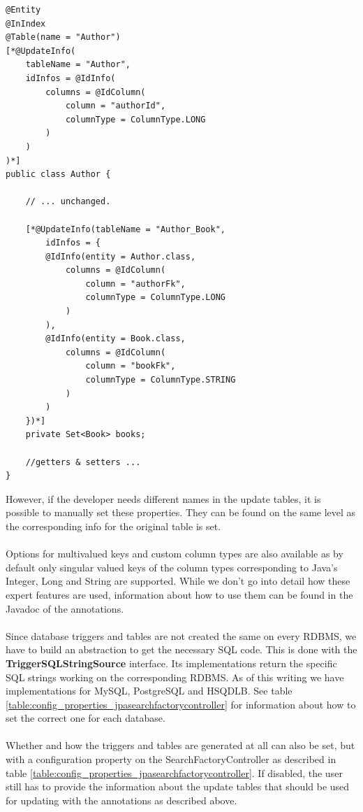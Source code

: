 \lstset{language=java}
\begin{lstlisting}[frame=htrbl, caption={Author.java with Hibernate Search annotations}, label={lst:author.java_3}]
@Entity
@InIndex
@Table(name = "Author")
[*@UpdateInfo(
	tableName = "Author", 
	idInfos = @IdInfo(
		columns = @IdColumn(
			column = "authorId", 
			columnType = ColumnType.LONG
		)
	)
)*]
public class Author {
	
	// ... unchanged.
	
	[*@UpdateInfo(tableName = "Author_Book", 
		idInfos = {
		@IdInfo(entity = Author.class, 
			columns = @IdColumn(
				column = "authorFk",
				columnType = ColumnType.LONG
			)
		),
		@IdInfo(entity = Book.class,
			columns = @IdColumn(
				column = "bookFk",
				columnType = ColumnType.STRING
			)
		)
	})*]
	private Set<Book> books;
	
	//getters & setters ...
}
\end{lstlisting}
\noindent
However, if the developer needs different names in the update tables, it is possible to manually set these properties. They can be found on the same level as the corresponding info for the original table is set.
\\\\
Options for multivalued keys and custom column types are also available as by default only singular valued keys of the column types corresponding to Java's Integer, Long and String are supported. While we don't go into detail how these expert features are used, information about how to use them can be found in the Javadoc of the annotations.
\\\\
Since database triggers and tables are not created the same on every RDBMS, we have to build an abstraction to get the necessary SQL code. This is done with the \textbf{TriggerSQLStringSource} interface. Its implementations return the specific SQL strings working on the corresponding RDBMS. As of this writing we have implementations for MySQL, PostgreSQL and HSQDLB. See table \ref{table:config_properties_jpasearchfactorycontroller} for information about how to set the correct one for each database.
\\\\
Whether and how the triggers and tables are generated at all can also be set, but with a configuration property on the SearchFactoryController as described in table  \ref{table:config_properties_jpasearchfactorycontroller}. If disabled, the user still has to provide the information about the update tables that should be used for updating with the annotations as described above.

